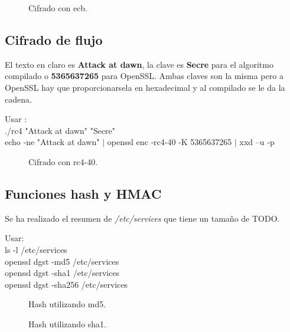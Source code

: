 \documentclass[11pt]{article}
\begin{document}
\begin{figure}[!h]
\begin{minipage}[c]{.5\textwidth}
          \caption{Cifrado con ecb.}
        \end{minipage}
      \end{figure}

    \subsection{Cifrado de flujo}
      \par
      El texto en claro es \textbf{Attack at dawn}, la clave es \textbf{Secre} para el algoritmo compilado o \textbf{5365637265} para OpenSSL. Ambas claves son la misma pero a OpenSSL hay que proporcionarsela
      en hexadecimal y al compilado se le da la cadena.
      \par
      Usar :\\
      ./rc4 "Attack at dawn" "Secre"\\
      echo ‐ne "Attack at dawn" $\mid$ openssl enc ‐rc4‐40 ‐K 5365637265 $\mid$ xxd –u ‐p

      \begin{figure}[!h]
        \centering
        \caption{Cifrado con rc4-40.}
      \end{figure}

    \subsection{Funciones hash y HMAC}
      \par
      Se ha realizado el resumen de \textit{/etc/services} que tiene un tamaño de TODO.

      \par
      Usar:\\
      ls -l /etc/services\\
      openssl dgst -md5 /etc/services\\
      openssl dgst -sha1 /etc/services\\
      openssl dgst -sha256 /etc/services\\

      \begin{figure}[!h]
        \centering
        \caption{Hash utilizando md5.}
      \end{figure}

      \begin{figure}[!h]
        \centering
        \caption{Hash utilizando sha1.}
      \end{figure}
\end{document}
